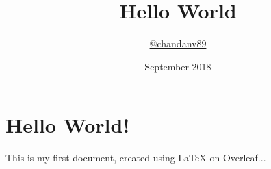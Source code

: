 \documentclass{article}
\title{Hello World}
\author{\href{https://github.com.chandanv89}{@chandanv89}}
\date{September 2018}
\begin{document}
\maketitle
\section{Hello World!}

This is my first document, created using \LaTeX{} on Overleaf...
\end{document}
